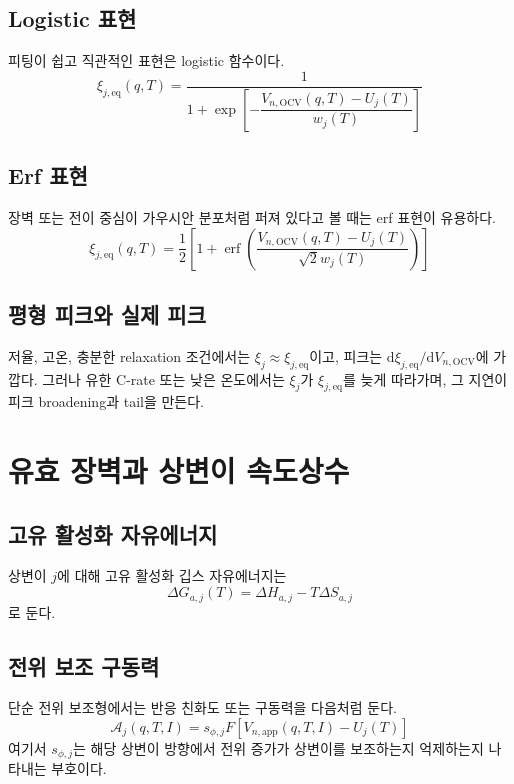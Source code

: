 \documentclass[11pt,a4paper]{article}
\newcommand{\dd}{\mathrm{d}}
\newcommand{\OCV}{\mathrm{OCV}}
\newcommand{\app}{\mathrm{app}}
\newcommand{\eq}{\mathrm{eq}}
\begin{document}
\subsection{Logistic 표현}
피팅이 쉽고 직관적인 표현은 logistic 함수이다.
\begin{equation}
\xi_{j,\eq}(q,T)=\frac{1}{1+\exp\left[-\dfrac{V_{n,\OCV}(q,T)-U_j(T)}{w_j(T)}\right]}
\label{eq:xi_eq_logistic}
\end{equation}

\subsection{Erf 표현}
장벽 또는 전이 중심이 가우시안 분포처럼 퍼져 있다고 볼 때는 erf 표현이 유용하다.
\begin{equation}
\xi_{j,\eq}(q,T)=\frac{1}{2}\left[1+\operatorname{erf}\left(\frac{V_{n,\OCV}(q,T)-U_j(T)}{\sqrt{2}w_j(T)}\right)\right]
\label{eq:xi_eq_erf}
\end{equation}

\subsection{평형 피크와 실제 피크}
저율, 고온, 충분한 relaxation 조건에서는 \(\xi_j\approx\xi_{j,\eq}\)이고, 피크는 \(\dd\xi_{j,\eq}/\dd V_{n,\OCV}\)에 가깝다. 그러나 유한 C-rate 또는 낮은 온도에서는 \(\xi_j\)가 \(\xi_{j,\eq}\)를 늦게 따라가며, 그 지연이 피크 broadening과 tail을 만든다.

\section{유효 장벽과 상변이 속도상수}
\subsection{고유 활성화 자유에너지}
상변이 \(j\)에 대해 고유 활성화 깁스 자유에너지는
\begin{equation}
\Delta G_{a,j}(T)=\Delta H_{a,j}-T\Delta S_{a,j}
\label{eq:Ga_def}
\end{equation}
로 둔다.

\subsection{전위 보조 구동력}
단순 전위 보조형에서는 반응 친화도 또는 구동력을 다음처럼 둔다.
\begin{equation}
\mathcal A_j(q,T,I)=s_{\phi,j}F\left[V_{n,\app}(q,T,I)-U_j(T)\right]
\label{eq:A_simple}
\end{equation}
여기서 \(s_{\phi,j}\)는 해당 상변이 방향에서 전위 증가가 상변이를 보조하는지 억제하는지 나타내는 부호이다.
\end{document}
